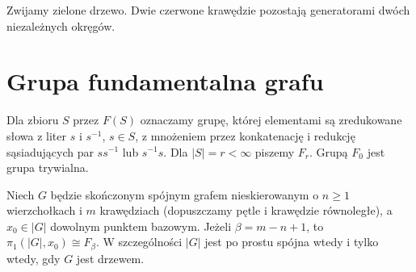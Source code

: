 \begin{center}

{\footnotesize Zwijamy zielone drzewo. Dwie czerwone krawędzie
pozostają generatorami dwóch niezależnych okręgów.}
\end{center}

\section{Grupa fundamentalna grafu}
\label{sec:tg-pi1}

\begin{definicja}
Dla zbioru $S$ przez $F(S)$ oznaczamy grupę, której elementami
są zredukowane słowa z liter $s$ i $s^{-1}$, $s\in S$,
z mnożeniem przez konkatenację i redukcję sąsiadujących par
$s s^{-1}$ lub $s^{-1}s$. Dla $|S|=r<\infty$ piszemy $F_r$.
Grupą $F_0$ jest grupa trywialna.
\end{definicja}

\begin{twierdzenie}
\label{thm:tg-free-pi1}
Niech $G$ będzie skończonym spójnym grafem nieskierowanym
o $n\geq1$ wierzchołkach i $m$ krawędziach
(dopuszczamy pętle i krawędzie równoległe),
a $x_0\in|G|$ dowolnym punktem bazowym. Jeżeli
$\beta=m-n+1$, to $\pi_1(|G|,x_0)\cong F_\beta$.
W szczególności $|G|$ jest po prostu spójna wtedy i tylko
wtedy, gdy $G$ jest drzewem.
\end{twierdzenie}

